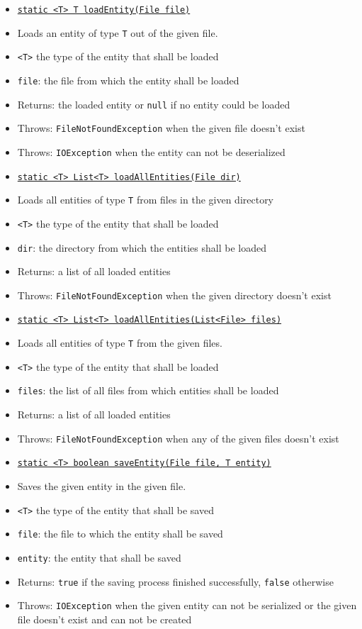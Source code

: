 \documentclass[parskip=full,11pt]{scrartcl}
\begin{document}
\begin{itemize}\itemsep -10pt
	\item \underline{\texttt{static <T> T loadEntity(File file)}}
	\item[] Loads an entity of type \texttt{T} out of the given file. 
	\item[] \texttt{<T>} the type of the entity that shall be loaded
	\item[] \texttt{file}: the file from which the entity shall be loaded
	\item[]Returns: the loaded entity or \texttt{null} if no entity could be loaded 
	\item[]Throws: \texttt{FileNotFoundException} when the given file doesn't exist
	\item[]Throws: \texttt{IOException} when the entity can not be deserialized
	
	\item \underline{\texttt{static <T> List<T> loadAllEntities(File dir)}}
	\item[] Loads all entities of type \texttt{T} from files in the given directory
	\item[] \texttt{<T>} the type of the entity that shall be loaded
	\item[] \texttt{dir}: the directory from which the entities shall be loaded
	\item[]Returns: a list of all loaded entities
	\item[]Throws: \texttt{FileNotFoundException} when the given directory doesn't exist
	
	\item \underline{\texttt{static <T> List<T> loadAllEntities(List<File> files)}}
	\item[] Loads all entities of type \texttt{T} from the given files.
	\item[] \texttt{<T>} the type of the entity that shall be loaded
	\item[] \texttt{files}: the list of all files from which entities shall be loaded
	\item[]Returns: a list of all loaded entities
	\item[]Throws: \texttt{FileNotFoundException} when any of the given files doesn't exist
	
	\item \underline{\texttt{static <T> boolean saveEntity(File file, T entity)}}
	\item[] Saves the given entity in the given file.
	\item[] \texttt{<T>} the type of the entity that shall be saved
	\item[] \texttt{file}: the file to which the entity shall  be saved
	\item[] \texttt{entity}: the entity that shall be saved
	\item[]Returns: \texttt{true} if the saving process finished successfully, \texttt{false} otherwise
	\item[] Throws: \texttt{IOException} when the given entity can not be serialized or the given file doesn't exist and can not be created
\end{itemize}
\end{document}
